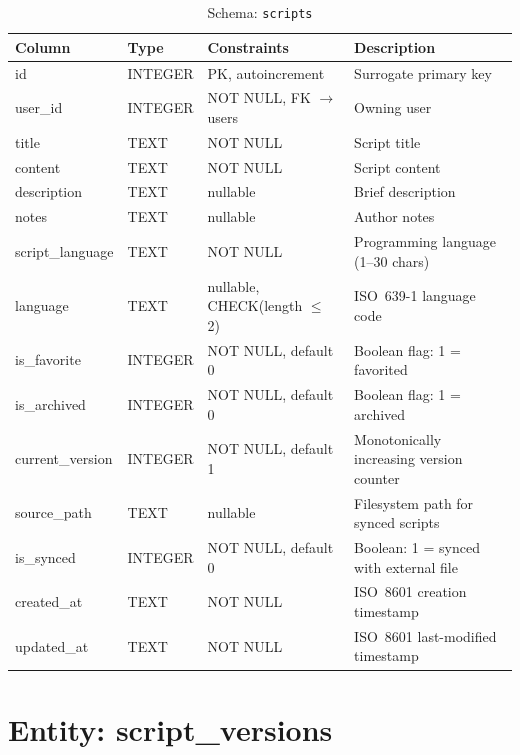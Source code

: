 \documentclass[a4paper, 11pt, oneside]{report}
\begin{document}
\begin{table}[H]
  \centering
  \caption{Schema: \texttt{scripts}}
  \label{tab:schema-scripts}
  \begin{tabularx}{\textwidth}{l l l X}
    \toprule
    \textbf{Column} & \textbf{Type} & \textbf{Constraints} & \textbf{Description} \\
    \midrule
    id               & INTEGER & PK, autoincrement        & Surrogate primary key \\
    user\_id         & INTEGER & NOT NULL, FK $\to$ users  & Owning user \\
    title            & TEXT    & NOT NULL                  & Script title \\
    content          & TEXT    & NOT NULL                  & Script content \\
    description      & TEXT    & nullable                  & Brief description \\
    notes            & TEXT    & nullable                  & Author notes \\
    script\_language & TEXT    & NOT NULL                  & Programming language (1--30 chars) \\
    language         & TEXT    & nullable, CHECK(length $\leq$ 2) & ISO~639-1 language code \\
    is\_favorite     & INTEGER & NOT NULL, default 0       & Boolean flag: 1 = favorited \\
    is\_archived     & INTEGER & NOT NULL, default 0       & Boolean flag: 1 = archived \\
    current\_version & INTEGER & NOT NULL, default 1       & Monotonically increasing version counter \\
    source\_path     & TEXT    & nullable                  & Filesystem path for synced scripts \\
    is\_synced       & INTEGER & NOT NULL, default 0       & Boolean: 1 = synced with external file \\
    created\_at      & TEXT    & NOT NULL                  & ISO~8601 creation timestamp \\
    updated\_at      & TEXT    & NOT NULL                  & ISO~8601 last-modified timestamp \\
    \bottomrule
  \end{tabularx}
\end{table}

\section{Entity: script\_versions}
\label{sec:entity-script-versions}
\end{document}
